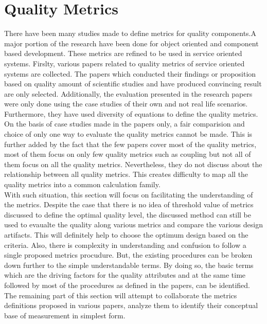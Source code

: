 \section{Quality Metrics}\label{section:quality_of_service/quality_metrics}
There have been many studies made to define metrics for quality components.A major portion of the research have been done for object oriented and component based development. These metrics are refined to be used in service oriented systems.\cite{Xiao-jun:2015aa, Sindhgatta:2015aa} Firslty, various papers related to quality metrics of service oriented systems are collected. The papers which conducted their findings or proposition based on quality amount of scientific studies and have produced convincing result are only selected.  Additionally, the evaluation presented in the research papers were only done using the case studies of their own and not real life scenarios. Furthermore, they have used diversity of equations to define the quality metrics. On the basis of case studies made in the papers only, a fair comparision and choice of only one way to evaluate the quality metrics cannot be made. This is further added by the fact that the few papers cover most of the quality metrics, most of them focus on only few quality metrics such as coupling but not all of them focus on all the quality metrics. Nevertheless, they do not discuss about the relationship between all quality metrics. \cite{Elhag:2014aa} This creates difficulty to map all the quality metrics into a common calculation family. 
\\
With such situation, this section will focus on facilitating the understanding of the metrics. Despite the case that there is no idea of threshold value of metrics discussed to define the optimal quality level, the discussed method can still be used to evaualte the quality along various metrics and compare the various design artifacts. This will definitely help to choose the optimum design based on the criteria. Also, there is complexity in understanding and confusion to follow a single proposed metrics procudure. But, the existing procedures can be broken down further to the simple understandable terms. By doing so, the basic terms which are the driving factors for the quality attributes and at the same time followed by most of the procedures as defined in the papers, can be identified.
\\
The remaining part of this section will attempt to collaborate the metrics definitions proposed in various papers, analyze them to identify their conceptual base of measurement in simplest form.

